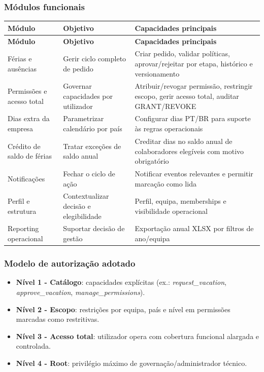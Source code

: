 \documentclass[11pt,a4paper]{article}
\begin{document}
\subsubsection{Módulos funcionais}
\begin{longtable}{p{3.1cm} p{4.9cm} p{5.1cm}}
\toprule
\textbf{Módulo} & \textbf{Objetivo} & \textbf{Capacidades principais} \\
\midrule
\endfirsthead
\toprule
\textbf{Módulo} & \textbf{Objetivo} & \textbf{Capacidades principais} \\
\midrule
\endhead
Férias e ausências & Gerir ciclo completo de pedido & Criar pedido, validar políticas, aprovar/rejeitar por etapa, histórico e versionamento \\
Permissões e acesso total & Governar capacidades por utilizador & Atribuir/revogar permissão, restringir escopo, gerir acesso total, auditar GRANT/REVOKE \\
Dias extra da empresa & Parametrizar calendário por país & Configurar dias PT/BR para suporte às regras operacionais \\
Crédito de saldo de férias & Tratar exceções de saldo anual & Creditar dias no saldo anual de colaboradores elegíveis com motivo obrigatório \\
Notificações & Fechar o ciclo de ação & Notificar eventos relevantes e permitir marcação como lida \\
Perfil e estrutura & Contextualizar decisão e elegibilidade & Perfil, equipa, memberships e visibilidade operacional \\
Reporting operacional & Suportar decisão de gestão & Exportação anual XLSX por filtros de ano/equipa \\
\bottomrule
\end{longtable}

\subsubsection{Modelo de autorização adotado}
\begin{itemize}
  \item \textbf{Nível 1 - Catálogo}: capacidades explícitas (ex.: \textit{request\_vacation}, \textit{approve\_vacation}, \textit{manage\_permissions}).
  \item \textbf{Nível 2 - Escopo}: restrições por equipa, país e nível em permissões marcadas como restritivas.
  \item \textbf{Nível 3 - Acesso total}: utilizador opera com cobertura funcional alargada e controlada.
  \item \textbf{Nível 4 - Root}: privilégio máximo de governação/administrador técnico.
\end{itemize}
\end{document}
